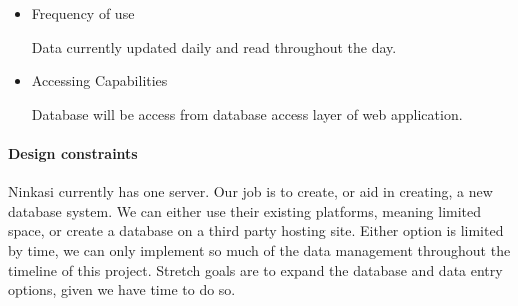 \begin{itemize}
\begin{itemize}
{                    recipe for given dry hop
                    \footnote{Example: dry hop type A = 50 lb, dry hop type B = 75 lb.}
                    \footnote{Dependent on the BEER and volume in fermentation (for dry hops).}.
                }
                \item{\textbf{Amount (lb)}:
                    amount in lbs of dry hops to be added to tank.
                }
                \item{\textbf{Monitoring Points}:
                    minimally measured daily.
                }
                \begin{itemize}
                    \item{\textbf{Specific Gravity}:
                        A measure that represents the amount of sugar left in the beer.
                        This number starts high and decreases throughtout fermentation.
                        When it stops we move on to the next process step
                    }
                    \item{\textbf{pH}:
                        pH level of batch in brewing vat.
                    }
                    \item{\textbf{ABV}: Alcohol By Volumne of batch.}
                    \item{\textbf{Temp}: Temperature of batch.}
                    \item{\textbf{Action}: Action taken.}
                    \item{\textbf{By}:
                        person taking the action above.
                    }
                \end{itemize}
            \end{itemize}
        \item{Frequency of use}

            Data currently updated daily and read throughout the day.

        \item{Accessing Capabilities}

            Database will be access from database access layer of web application.
    \end{itemize}

	\paragraph{Design constraints}
		Ninkasi currently has one server.
		Our job is to create, or aid in creating, a new database system.
		We can either use their existing platforms, meaning limited space, or create a database on a third party hosting site.
		Either option is limited by time, we can only implement so much of the data management throughout the timeline of this project.
		Stretch goals are to expand the database and data entry options, given we have time to do so.

